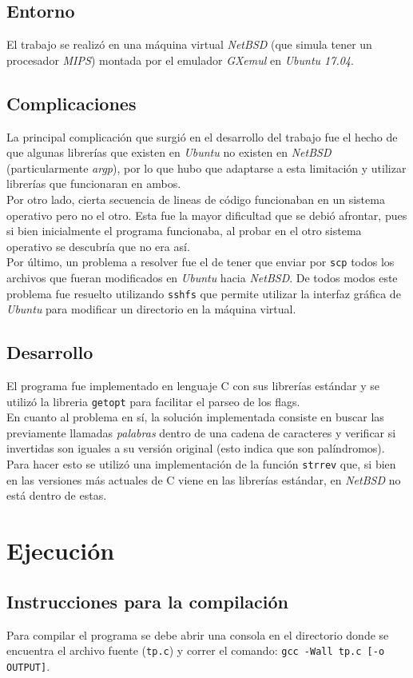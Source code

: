 \documentclass[a4paper, 10pt]{article}
\def\code#1{\texttt{#1}}
\newcommand\tab[1][0.5cm]{\hspace*{#1}}
\begin{document}
		\subsection{Entorno}
			El trabajo se realizó en una máquina virtual \emph{NetBSD} (que simula tener un procesador
			\emph{MIPS}) montada por el emulador \emph{GXemul} en \emph{Ubuntu 17.04}.
		\subsection{Complicaciones}
			La principal complicación que surgió en el desarrollo del trabajo fue el hecho de que algunas
			librerías que existen en \emph{Ubuntu} no existen en \emph{NetBSD} (particularmente \emph{argp}),
			por lo que hubo que adaptarse a esta limitación y utilizar librerías que funcionaran en ambos. \\
			\tab Por otro lado, cierta secuencia de lineas de código funcionaban en un sistema operativo pero
			no el otro. Esta fue la mayor dificultad que se debió afrontar, pues si bien inicialmente el programa
			funcionaba, al probar en el otro sistema operativo se descubría que no era así. \\
			\tab Por último, un problema a resolver fue el de tener que enviar por \code{scp} todos los archivos
			que fueran modificados en \emph{Ubuntu} hacia \emph{NetBSD}. De todos modos este problema fue
			resuelto utilizando \code{sshfs} que permite utilizar la interfaz gráfica de \emph{Ubuntu} para
			modificar un directorio en la máquina virtual.
		\subsection{Desarrollo}
			El programa fue implementado en lenguaje C con sus librerías estándar y se utilizó la libreria
			\code{getopt} para facilitar el parseo de los flags. \\
			\tab En cuanto al problema en sí, la solución implementada consiste en buscar las previamente
			llamadas \emph{palabras} dentro de una cadena de caracteres y verificar si invertidas son iguales
			a su versión original (esto indica que son palíndromos). Para hacer esto se utilizó una implementación
			de la función \code{strrev} que, si bien en las versiones más actuales de C viene en las librerías 
			estándar, en \emph{NetBSD} no está dentro de estas.
	\section{Ejecución}
		\subsection{Instrucciones para la compilación}
			Para compilar el programa se debe abrir una consola en el directorio donde se encuentra el archivo
			fuente (\code{tp.c}) y correr el comando: \code{gcc -Wall tp.c [-o OUTPUT]}.
\end{document}
